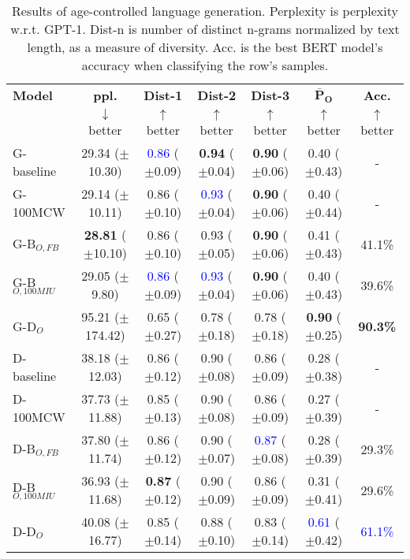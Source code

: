 \begin{table*}[h]
    \centering
    \begin{tabular}{l | c c c c | c c}
    \toprule
    \textbf{Model} & \textbf{ppl.} & \textbf{Dist-1} & \textbf{Dist-2} & \textbf{Dist-3} & $\boldsymbol{\bar{P}_O}$ & \textbf{Acc.}\\
     & $\downarrow$ better & $\uparrow$ better & $\uparrow$ better & $\uparrow$ better & $\uparrow$ better & $\uparrow$ better\\
    \midrule
    \midrule
    G-baseline & 29.34 ($\pm$10.30) & \textcolor{blue}{0.86} ($\pm$0.09) & \textbf{0.94} ($\pm$0.04) & \textbf{0.90} ($\pm$0.06) & 0.40 ($\pm$0.43) & -\\
    G-100MCW & 29.14 ($\pm$10.11) & 0.86 ($\pm$0.10) & \textcolor{blue}{0.93} ($\pm$0.04) & \textbf{0.90} ($\pm$0.06) & 0.40 ($\pm$0.44) & -\\
    \midrule
    G-B$_{O, FB}$ & \textbf{28.81} ($\pm$10.10) & 0.86 ($\pm$0.10) & 0.93 ($\pm$0.05) & \textbf{0.90} ($\pm$0.06) & 0.41 ($\pm$0.43) & 41.1\%\\
    G-B$_{O, 100MIU}$ & 29.05 ($\pm$9.80) & \textcolor{blue}{0.86} ($\pm$0.09) & \textcolor{blue}{0.93} ($\pm$0.04) & \textbf{0.90} ($\pm$0.06) & 0.40 ($\pm$0.43) & 39.6\%\\
    \midrule
    G-D$_{O}$ & 95.21 ($\pm$174.42) & 0.65 ($\pm$0.27) & 0.78 ($\pm$0.18) & 0.78 ($\pm$0.18) & \textbf{0.90} ($\pm$0.25) & \textbf{90.3\%}\\
    \midrule
    \midrule
    D-baseline & 38.18 ($\pm$12.03) & 0.86 ($\pm$0.12) & 0.90 ($\pm$0.08) & 0.86 ($\pm$0.09) & 0.28 ($\pm$0.38) & -\\
    D-100MCW & 37.73 ($\pm$11.88) & 0.85 ($\pm$0.13) & 0.90 ($\pm$0.08) & 0.86 ($\pm$0.09) & 0.27 ($\pm$0.39) & -\\
    \midrule
    D-B$_{O, FB}$ & 37.80 ($\pm$11.74) & 0.86 ($\pm$0.12) & 0.90 ($\pm$0.07) & \textcolor{blue}{0.87} ($\pm$0.08) & 0.28 ($\pm$0.39) & 29.3\%\\
    D-B$_{O, 100MIU}$ & 36.93 ($\pm$11.68) & \textbf{0.87} ($\pm$0.12) & 0.90 ($\pm$0.09) & 0.86 ($\pm$0.09) & 0.31 ($\pm$0.41) & 29.6\%\\
    \midrule
    D-D$_{O}$ & 40.08 ($\pm$16.77) & 0.85 ($\pm$0.14) & 0.88 ($\pm$0.10) & 0.83 ($\pm$0.14) & \textcolor{blue}{0.61} ($\pm$0.42) & \textcolor{blue}{61.1\%}\\
    \bottomrule
    \end{tabular}
    \caption{ Results of age-controlled language generation. Perplexity is perplexity w.r.t. GPT-1. Dist-n is number of distinct n-grams normalized by text length, as a measure of diversity. Acc. is the best BERT model's accuracy when classifying the row's samples.}
    \label{tab:ctg_results_ws_old_prompt_old_model}
\end{table*}


